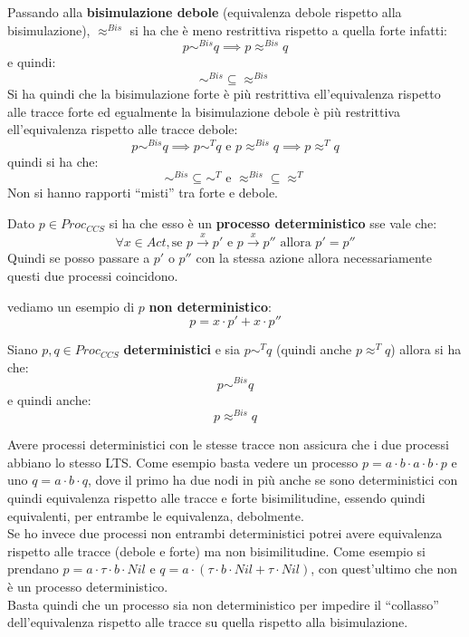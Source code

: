 \documentclass[a4paper,12pt, oneside]{book}
\begin{document}
Passando alla \textbf{bisimulazione debole} (equivalenza debole rispetto alla
bisimulazione), $\approx^{Bis}$ si ha che è meno 
restrittiva rispetto a quella forte infatti:
\[p\sim^{Bis} q\implies p\approx^{Bis} q\]
e quindi:
\[\sim^{Bis} \subseteq \approx^{Bis}\]
Si ha quindi che la bisimulazione forte è più restrittiva ell’equivalenza
rispetto alle tracce forte ed egualmente la bisimulazione debole è più
restrittiva ell’equivalenza rispetto alle tracce debole:
\[p\sim^{Bis}q\implies p\sim^T q\mbox{ e }p\approx^{Bis}q\implies p\approx^Tq\]
quindi si ha che:
\[\sim^{Bis}\subseteq\sim^T \mbox{ e }\approx^{Bis}\subseteq\approx^T\]
Non si hanno rapporti ``misti'' tra forte e debole.\\

\begin{definizione}
  Dato $p\in Proc_{CCS}$ si ha che esso è un \textbf{processo deterministico}
  sse vale che:
  \[\forall x\in Act,\mbox{se } p\stackrel{x}{\rightarrow}p'\mbox{ e
    }p\stackrel{x}{\rightarrow}p''\mbox{ allora }p'=p''\]
  Quindi se posso passare a $p'$ o $p''$ con la stessa azione allora
  necessariamente questi due processi coincidono.
\end{definizione}
\begin{esempio}
  vediamo un esempio di $p$ \textbf{non deterministico}:
  \[p=x\cdot p'+x\cdot p''\]
\end{esempio}
\begin{teorema}
  Siano $p,q\in Proc_{CCS}$ \textbf{deterministici} e sia $p\sim^Tq$ (quindi
  anche $p\approx^Tq$) allora si ha che:
  \[p\sim^{Bis}q\]
  e quindi anche:
  \[p\approx^{Bis}q\]
\end{teorema}
Avere processi deterministici con le stesse tracce non assicura che i due
processi abbiano lo stesso LTS. Come esempio basta vedere un processo $p=a\cdot
b\cdot a\cdot b\cdot p$ e uno $q=a\cdot b\cdot q$, dove il primo ha due nodi in
più anche se sono deterministici con quindi equivalenza rispetto alle tracce e
forte bisimilitudine, essendo quindi equivalenti, per entrambe le equivalenza,
debolmente.\\ 
Se ho invece due processi non entrambi deterministici potrei avere equivalenza
rispetto alle tracce (debole e forte) ma non bisimilitudine. Come esempio si
prendano $p=a\cdot \tau\cdot b\cdot Nil$ e $q=a\cdot(\tau\cdot b\cdot Nil+\tau
\cdot Nil)$, con quest'ultimo che non è un processo deterministico.\\
Basta quindi che un processo sia non deterministico per impedire il ``collasso''
dell'equivalenza rispetto alle tracce su quella rispetto alla bisimulazione.\\
\end{document}
